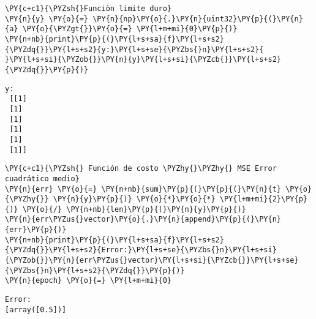     \begin{tcolorbox}[breakable, size=fbox, boxrule=1pt, pad at break*=1mm,colback=cellbackground, colframe=cellborder]
\begin{Verbatim}[commandchars=\\\{\}]
\PY{c+c1}{\PYZsh{}Funciòn limite duro}
\PY{n}{y} \PY{o}{=} \PY{n}{np}\PY{o}{.}\PY{n}{uint32}\PY{p}{(}\PY{n}{a} \PY{o}{\PYZgt{}}\PY{o}{=} \PY{l+m+mi}{0}\PY{p}{)}
\PY{n+nb}{print}\PY{p}{(}\PY{l+s+sa}{f}\PY{l+s+s2}{\PYZdq{}}\PY{l+s+s2}{y:}\PY{l+s+se}{\PYZbs{}n}\PY{l+s+s2}{ }\PY{l+s+si}{\PYZob{}}\PY{n}{y}\PY{l+s+si}{\PYZcb{}}\PY{l+s+s2}{\PYZdq{}}\PY{p}{)}
\end{Verbatim}
\end{tcolorbox}

    \begin{Verbatim}[commandchars=\\\{\}]
y:
 [[1]
 [1]
 [1]
 [1]
 [1]
 [1]]
    \end{Verbatim}

    \begin{tcolorbox}[breakable, size=fbox, boxrule=1pt, pad at break*=1mm,colback=cellbackground, colframe=cellborder]
\begin{Verbatim}[commandchars=\\\{\}]
\PY{c+c1}{\PYZsh{} Función de costo \PYZhy{}\PYZhy{} MSE Error cuadrático medio}
\PY{n}{err} \PY{o}{=} \PY{n+nb}{sum}\PY{p}{(}\PY{p}{(}\PY{n}{t} \PY{o}{\PYZhy{}} \PY{n}{y}\PY{p}{)} \PY{o}{*}\PY{o}{*} \PY{l+m+mi}{2}\PY{p}{)} \PY{o}{/} \PY{n+nb}{len}\PY{p}{(}\PY{n}{y}\PY{p}{)}
\PY{n}{err\PYZus{}vector}\PY{o}{.}\PY{n}{append}\PY{p}{(}\PY{n}{err}\PY{p}{)}
\PY{n+nb}{print}\PY{p}{(}\PY{l+s+sa}{f}\PY{l+s+s2}{\PYZdq{}}\PY{l+s+s2}{Error:}\PY{l+s+se}{\PYZbs{}n}\PY{l+s+si}{\PYZob{}}\PY{n}{err\PYZus{}vector}\PY{l+s+si}{\PYZcb{}}\PY{l+s+se}{\PYZbs{}n}\PY{l+s+s2}{\PYZdq{}}\PY{p}{)}
\PY{n}{epoch} \PY{o}{=} \PY{l+m+mi}{0}
\end{Verbatim}
\end{tcolorbox}

    \begin{Verbatim}[commandchars=\\\{\}]
Error:
[array([0.5])]

    \end{Verbatim}

